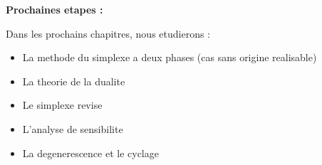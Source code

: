 \documentclass[12pt,a4paper]{article}
\begin{document}
\begin{astuce}
\textbf{Prochaines etapes :}

Dans les prochains chapitres, nous etudierons :
\begin{itemize}
    \item La methode du simplexe a deux phases (cas sans origine realisable)
    \item La theorie de la dualite
    \item Le simplexe revise
    \item L'analyse de sensibilite
    \item La degenerescence et le cyclage
\end{itemize}
\end{astuce}
\end{document}
